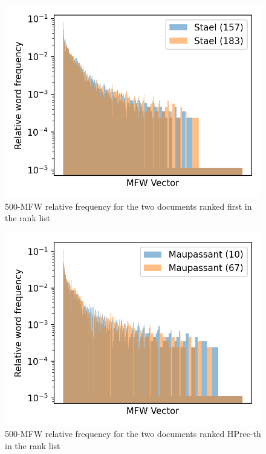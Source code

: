 \begin{figure}
  \includegraphics[width=\linewidth]{img/mfw_vector_first_rl.png}
  \caption{500-MFW relative frequency for the two documents ranked first in the rank list}
  \label{fig:mfw_vector_first_rl}
\end{figure}
\begin{figure}
  \includegraphics[width=\linewidth]{img/mfw_vector_first_last_rl.png}
  \caption{500-MFW relative frequency for the two documents ranked HPrec-th in the rank list}
  \label{fig:mfw_vector_first_last_rl}
\end{figure}
